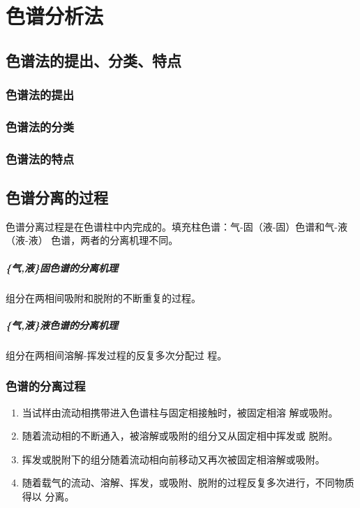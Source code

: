 \chapter{色谱分析法}

\section{色谱法的提出、分类、特点}

\subsection{色谱法的提出}

\subsection{色谱法的分类}

\subsection{色谱法的特点}

\section{色谱分离的过程}

色谱分离过程是在色谱柱中内完成的。填充柱色谱：气-固（液-固）色谱和气-液（液-液）
色谱，两者的分离机理不同。

\paragraph{\{气,液\}固色谱的分离机理} 组分在两相间吸附和脱附的不断重复的过程。

\paragraph{\{气,液\}液色谱的分离机理} 组分在两相间溶解-挥发过程的反复多次分配过
程。

\subsection{色谱的分离过程}

\begin{enumerate} \item 当试样由流动相携带进入色谱柱与固定相接触时，被固定相溶
          解或吸附。\item 随着流动相的不断通入，被溶解或吸附的组分又从固定相中挥发或
          脱附。\item 挥发或脱附下的组分随着流动相向前移动又再次被固定相溶解或吸附。
    \item 随着载气的流动、溶解、挥发，或吸附、脱附的过程反复多次进行，不同物质得以
          分离。\end{enumerate}


